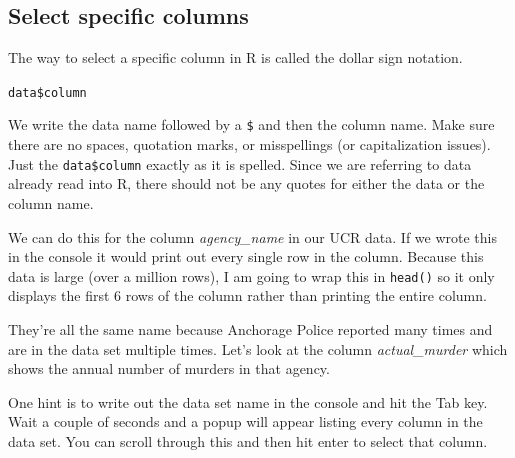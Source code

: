 \documentclass[
]{krantz}
\makeatletter
\newenvironment{Shaded}{\begin{snugshade}}{\end{snugshade}}
\newcommand{\CommentTok}[1]{\textcolor[rgb]{0.37,0.37,0.37}{\textit{#1}}}
\newcommand{\FunctionTok}[1]{\textcolor[rgb]{0,0,0}{#1}}
\newcommand{\NormalTok}[1]{#1}
\newcommand{\SpecialCharTok}[1]{\textcolor[rgb]{0,0,0}{#1}}
\newenvironment{kframe}{%
\medskip{}
\setlength{\fboxsep}{.8em}
 \def\at@end@of@kframe{}%
 \ifinner\ifhmode%
  \def\at@end@of@kframe{\end{minipage}}%
  \begin{minipage}{\columnwidth}%
 \fi\fi%
 \def\FrameCommand##1{\hskip\@totalleftmargin \hskip-\fboxsep
 \colorbox{shadecolor}{##1}\hskip-\fboxsep
     \hskip-\linewidth \hskip-\@totalleftmargin \hskip\columnwidth}%
 \MakeFramed {\advance\hsize-\width
   \@totalleftmargin\z@ \linewidth\hsize
   \@setminipage}}%
 {\par\unskip\endMakeFramed%
 \at@end@of@kframe}
\renewenvironment{Shaded}{\begin{kframe}}{\end{kframe}}
\makeatother
\begin{document}
\hypertarget{select-specific-columns}{%
\subsection{Select specific
columns}\label{select-specific-columns}}

The way to select a specific column in R is called the
dollar sign notation.

\texttt{data\$column}

We write the data name followed by a \texttt{\$} and then
the column name. Make sure there are no spaces, quotation
marks, or misspellings (or capitalization issues). Just the
\texttt{data\$column} exactly as it is spelled. Since we are
referring to data already read into R, there should not be
any quotes for either the data or the column name.

We can do this for the column \emph{agency\_name} in our UCR
data. If we wrote this in the console it would print out
every single row in the column. Because this data is large
(over a million rows), I am going to wrap this in
\texttt{head()} so it only displays the first 6 rows of the
column rather than printing the entire column.

\begin{Shaded}
\end{Shaded}

They're all the same name because Anchorage Police reported
many times and are in the data set multiple times. Let's
look at the column \emph{actual\_murder} which shows the
annual number of murders in that agency.

\begin{Shaded}
\end{Shaded}

One hint is to write out the data set name in the console
and hit the Tab key. Wait a couple of seconds and a popup
will appear listing every column in the data set. You can
scroll through this and then hit enter to select that
column.
\end{document}
